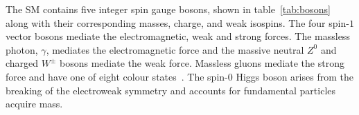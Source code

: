 \begin{table}[htbp]
\label{tab:fermions}
  \centering
\end{table}

The SM contains five integer spin gauge bosons, shown in table~\ref{tab:bosons} along with their corresponding masses, charge, and weak isospins.
The four spin-$1$ vector bosons mediate the electromagnetic, weak and strong forces.
The massless photon, $\gamma$, mediates the electromagnetic force and the massive neutral $Z^0$ and charged  $W^\pm$ bosons mediate the weak force.
Massless gluons mediate the strong force and have one of eight colour states~\cite{LagrangiansSM}. 
The spin-$0$ Higgs boson arises from the breaking of the electroweak symmetry and accounts for fundamental particles acquire mass.

